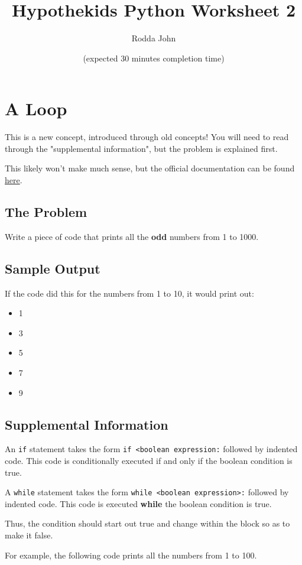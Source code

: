 \documentclass[11pt]{article}
\author{Rodda John}
\date{(expected 30 minutes completion time)}
\title{Hypothekids Python Worksheet 2}
\begin{document}
\maketitle

\section{A Loop}
\label{sec:orgf3bea5e}
This is a new concept, introduced through old concepts!  You will need to read through the "supplemental information", but the problem is explained first.

This likely won't make much sense, but the official documentation can be found \href{https://docs.python.org/3/reference/compound\_stmts.html\#the-while-statement}{here}.
\subsection{The Problem}
\label{sec:org2026065}
Write a piece of code that prints all the \textbf{odd} numbers from 1 to 1000.
\subsection{Sample Output}
\label{sec:orgf1bc1b3}
If the code did this for the numbers from 1 to 10, it would print out:
\begin{itemize}
\item 1
\item 3
\item 5
\item 7
\item 9
\end{itemize}
\subsection{Supplemental Information}
\label{sec:org33064ec}
An \texttt{if} statement takes the form \texttt{if <boolean expression:} followed by indented code.  This code is conditionally executed if and only if the boolean condition is true.

A \texttt{while} statement takes the form \texttt{while <boolean expression>:} followed by indented code.  This code is executed \textbf{while} the boolean condition is true.

Thus, the condition should start out true and change within the block so as to make it false.

For example, the following code prints all the numbers from 1 to 100.
\end{document}
